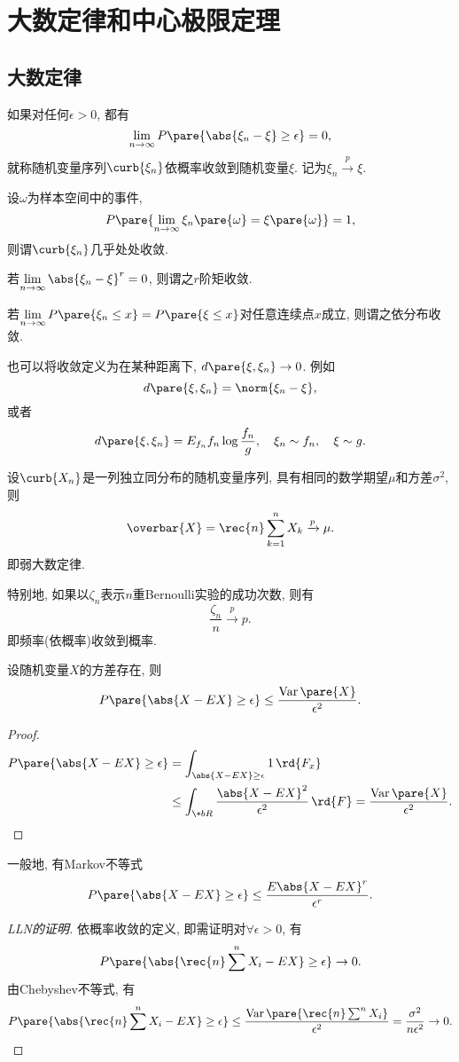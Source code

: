 \documentclass{ctexart}
\DeclareMathOperator{\Var}{Var}
\begin{document}
\section{大数定律和中心极限定理} %
\label{sec:大数定律和中心极限定理}

\subsection{大数定律} %
\label{sub:大数定律}

如果对任何$\epsilon>0$, 都有
\[ \lim_{n\rightarrow \infty} P\pare{\abs{\xi_n - \xi}\ge \epsilon} = 0, \]
就称随机变量序列$\curb{\xi_n}$依概率收敛到随机变量$\xi$. 记为$\xi_n\xrightarrow{p} \xi$.
\par
设$\omega$为样本空间中的事件,
\[ P\pare{\lim_{n\rightarrow\infty}\xi_n\pare{\omega} = \xi\pare{\omega}} = 1, \]
则谓$\curb{\xi_n}$几乎处处收敛.
\par
若$\displaystyle \lim_{n\rightarrow\infty} \abs{\xi_n - \xi}^r = 0$, 则谓之$r$阶矩收敛.
\par
若$\displaystyle \lim_{n\rightarrow\infty} P\pare{\xi_n \le x} = P\pare{\xi \le x}$对任意连续点$x$成立, 则谓之依分布收敛.
\par
也可以将收敛定义为在某种距离下, $d\pare{\xi, \xi_n}\rightarrow 0$. 例如
\[ d\pare{\xi, \xi_n} = \norm{\xi_n - \xi}, \]
或者
\[ d\pare{\xi, \xi_n} = E_{f_n}f_n\log \frac{f_n}{g}, \quad \xi_n \sim f_n,\quad \xi\sim g. \]
\begin{theorem}
    设$\curb{X_n}$是一列独立同分布的随机变量序列, 具有相同的数学期望$\mu$和方差$\sigma^2$, 则
    \[ \overbar{X} = \rec{n} \sum_{k=1}^n X_k \xrightarrow{p} \mu. \]
    即弱大数定律.
\end{theorem}
特别地, 如果以$\zeta_n$表示$n$重Bernoulli实验的成功次数, 则有
\[ \frac{\zeta_n}{n} \xrightarrow{p} p. \]
即频率(依概率)收敛到概率.
\begin{lemma}[Chebyshev不等式]
    设随机变量$X$的方差存在, 则
    \[ P\pare{\abs{X-EX} \ge \epsilon} \le \frac{\Var\pare{X}}{\epsilon^2}. \]
\end{lemma}
\begin{proof}
    \begin{align*}
        P\pare{\abs{X-EX}\ge \epsilon} &= \int_{\abs{X-EX}\ge\epsilon} 1\,\rd{F_x} \\
        & \le \int_{\+bR} \frac{\abs{X-EX}^2}{\epsilon^2}\,\rd{F} = \frac{\Var\pare{X}}{\epsilon^2}. \qedhere
    \end{align*}
\end{proof}
\begin{remark}
    一般地, 有Markov不等式
    \[ P\pare{\abs{X-EX}\ge \epsilon} \le \frac{E\abs{X-EX}^r}{\epsilon^r}. \]
\end{remark}
\begin{proof}[LLN的证明]
    依概率收敛的定义, 即需证明对$\forall \epsilon>0$, 有
    \[ P\pare{\abs{\rec{n} \sum^n X_i - EX}\ge \epsilon}\rightarrow 0. \]
    由Chebyshev不等式, 有
    \[ P\pare{\abs{\rec{n}\sum^n X_i - EX}\ge\epsilon} \le \frac{\Var\pare{\rec{n}\sum^n X_i}}{\epsilon^2} = \frac{\sigma^2}{n\epsilon^2}\rightarrow 0. \qedhere \]
\end{proof}
\end{document}
